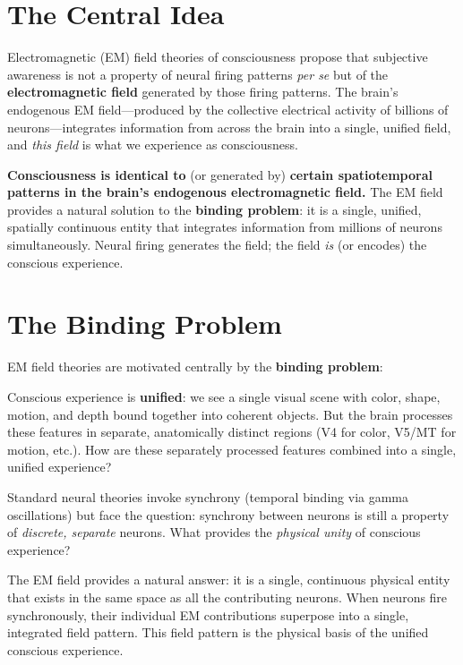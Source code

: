 \documentclass[11pt,a4paper]{report}
\begin{document}
\section{The Central Idea}

Electromagnetic (EM) field theories of consciousness propose that subjective awareness is not a property of neural firing patterns \emph{per se} but of the \textbf{electromagnetic field} generated by those firing patterns. The brain's endogenous EM field---produced by the collective electrical activity of billions of neurons---integrates information from across the brain into a single, unified field, and \emph{this field} is what we experience as consciousness.

\begin{definitionbox}
\textbf{Consciousness is identical to} (or generated by) \textbf{certain spatiotemporal patterns in the brain's endogenous electromagnetic field.} The EM field provides a natural solution to the \textbf{binding problem}: it is a single, unified, spatially continuous entity that integrates information from millions of neurons simultaneously. Neural firing generates the field; the field \emph{is} (or encodes) the conscious experience.
\end{definitionbox}

\section{The Binding Problem}

EM field theories are motivated centrally by the \textbf{binding problem}:

\begin{definitionbox}
Conscious experience is \textbf{unified}: we see a single visual scene with color, shape, motion, and depth bound together into coherent objects. But the brain processes these features in separate, anatomically distinct regions (V4 for color, V5/MT for motion, etc.). How are these separately processed features combined into a single, unified experience?

Standard neural theories invoke synchrony (temporal binding via gamma oscillations) but face the question: synchrony between neurons is still a property of \emph{discrete, separate} neurons. What provides the \emph{physical unity} of conscious experience?
\end{definitionbox}

The EM field provides a natural answer: it is a single, continuous physical entity that exists in the same space as all the contributing neurons. When neurons fire synchronously, their individual EM contributions superpose into a single, integrated field pattern. This field pattern is the physical basis of the unified conscious experience.
\end{document}
